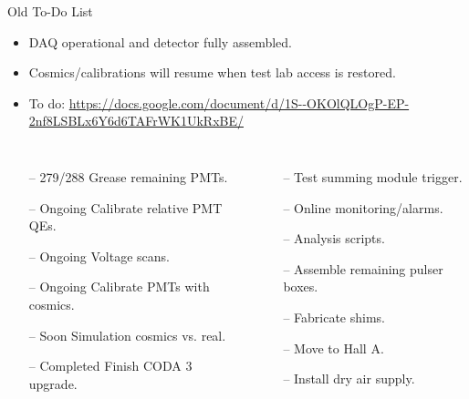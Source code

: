\documentclass[10pt]{beamer}
\begin{document}
\begin{frame}{Old To-Do List}

	\begin{itemize}
		\item {}\alert{DAQ operational and detector fully assembled.}
		\item {}\alert{Cosmics/calibrations will resume when test lab access is restored.}
		\item {}\alert{To do:} \url{https://docs.google.com/document/d/1S--OKOlQLOgP-EP-2nf8LSBLx6Y6d6TAFrWK1UkRxBE/}
	\end{itemize}
	
	\begin{columns}[T,onlytextwidth]

			\begin{itemize}\itemsep0pt \parskip0pt 
				\item[--] \footnotesize{\alert{279/288} Grease remaining PMTs.}
				\item[--] \footnotesize{\alert{Ongoing} Calibrate relative PMT QEs.}
				\item[--] \footnotesize{\alert{Ongoing} Voltage scans.}
				\item[--] \footnotesize{\alert{Ongoing} Calibrate PMTs with cosmics.}
				\item[--] \footnotesize{\alert{Soon} Simulation cosmics vs. real.}
				\item[--] \footnotesize{\alert{Completed} Finish CODA 3 upgrade.}
			\end{itemize}
				
			\begin{itemize}\itemsep0pt \parskip0pt 
				\item[--] \footnotesize{Test summing module trigger.}	
				\item[--] \footnotesize{Online monitoring/alarms.}
				\item[--] \footnotesize{Analysis scripts.}
				\item[--] \footnotesize{Assemble remaining pulser boxes.}
				\item[--] \footnotesize{Fabricate shims.}
				\item[--] \footnotesize{Move to Hall A.}
				\item[--] \footnotesize{Install dry air supply.}
			\end{itemize}
			\end{columns}
				

\end{frame}
\end{document}
